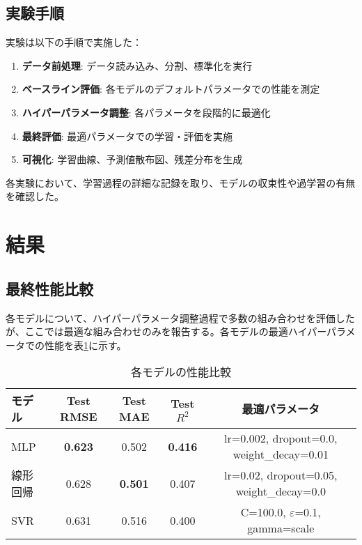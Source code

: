 \documentclass[12pt,a4paper,dvipdfmx]{jsarticle}
\begin{document}
\subsection{実験手順}

実験は以下の手順で実施した：

\begin{enumerate}
    \item \textbf{データ前処理}: データ読み込み、分割、標準化を実行
    \item \textbf{ベースライン評価}: 各モデルのデフォルトパラメータでの性能を測定
    \item \textbf{ハイパーパラメータ調整}: 各パラメータを段階的に最適化
    \item \textbf{最終評価}: 最適パラメータでの学習・評価を実施
    \item \textbf{可視化}: 学習曲線、予測値散布図、残差分布を生成
\end{enumerate}

各実験において、学習過程の詳細な記録を取り、モデルの収束性や過学習の有無を確認した。

\section{結果}

\subsection{最終性能比較}

各モデルについて、ハイパーパラメータ調整過程で多数の組み合わせを評価したが、ここでは最適な組み合わせのみを報告する。各モデルの最適ハイパーパラメータでの性能を表\ref{tab:performance}に示す。

\begin{table}[h]
\centering
\caption{各モデルの性能比較}
\label{tab:performance}
\begin{tabular}{lcccc}
\toprule
モデル & Test RMSE & Test MAE & Test $R^2$ & 最適パラメータ \\
\midrule
MLP & \textbf{0.623} & 0.502 & \textbf{0.416} & lr=0.002, dropout=0.0, weight\_decay=0.01 \\
線形回帰 & 0.628 & \textbf{0.501} & 0.407 & lr=0.02, dropout=0.05, weight\_decay=0.0 \\
SVR & 0.631 & 0.516 & 0.400 & C=100.0, $\varepsilon$=0.1, gamma=scale \\
\bottomrule
\end{tabular}
\end{table}
\end{document}
